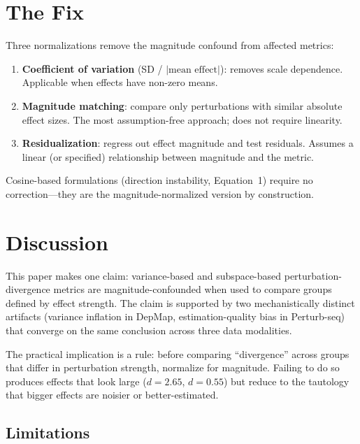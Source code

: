 \documentclass[11pt]{article}
\begin{document}
\section{The Fix}

Three normalizations remove the magnitude confound from affected
metrics:

\begin{enumerate}
  \item \textbf{Coefficient of variation} (SD / $|\text{mean effect}|$):
    removes scale dependence. Applicable when effects have non-zero means.
  \item \textbf{Magnitude matching}: compare only perturbations with
    similar absolute effect sizes. The most assumption-free approach; does
    not require linearity.
  \item \textbf{Residualization}: regress out effect magnitude and test
    residuals. Assumes a linear (or specified) relationship between
    magnitude and the metric.
\end{enumerate}

Cosine-based formulations (direction instability, Equation~1) require no
correction---they are the magnitude-normalized version by construction.

\section{Discussion}

This paper makes one claim: variance-based and subspace-based
perturbation-divergence metrics are magnitude-confounded when used to
compare groups defined by effect strength. The claim is supported by two
mechanistically distinct artifacts (variance inflation in DepMap,
estimation-quality bias in Perturb-seq) that converge on the same
conclusion across three data modalities.

The practical implication is a rule: before comparing ``divergence''
across groups that differ in perturbation strength, normalize for
magnitude. Failing to do so produces effects that look large ($d = 2.65$,
$d = 0.55$) but reduce to the tautology that bigger effects are noisier
or better-estimated.

\subsection{Limitations}
\end{document}
